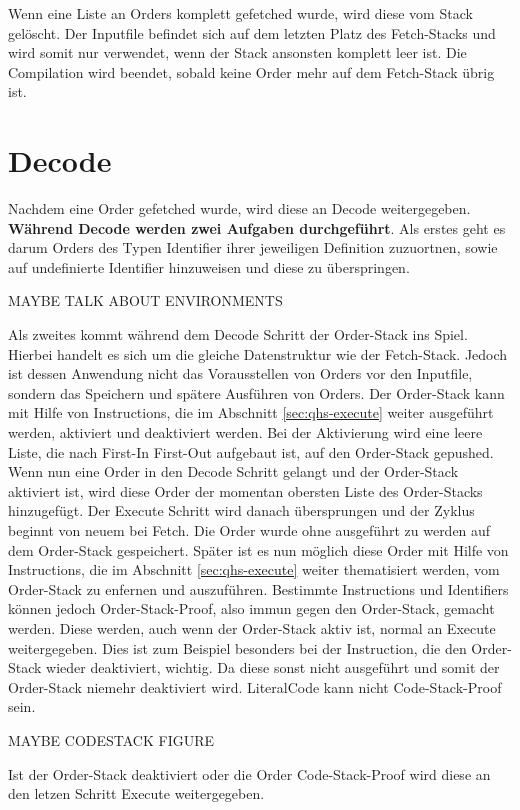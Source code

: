 Wenn eine Liste an Orders komplett gefetched wurde, wird diese vom Stack gelöscht. Der Inputfile befindet sich auf dem letzten Platz des Fetch-Stacks und wird somit nur verwendet, wenn der Stack ansonsten komplett leer ist.
Die Compilation wird beendet, sobald keine Order mehr auf dem Fetch-Stack übrig ist.

\section{Decode} \label{sec:qhs-decode}
Nachdem eine Order gefetched wurde, wird diese an Decode weitergegeben. \textbf{Während Decode werden zwei Aufgaben durchgeführt}.
Als erstes geht es darum Orders des Typen Identifier ihrer jeweiligen Definition zuzuortnen, sowie auf undefinierte Identifier hinzuweisen und diese zu überspringen.

MAYBE TALK ABOUT ENVIRONMENTS

Als zweites kommt während dem Decode Schritt der Order-Stack ins Spiel. Hierbei handelt es sich um die gleiche Datenstruktur wie der Fetch-Stack. Jedoch ist dessen Anwendung nicht das Vorausstellen von Orders vor den Inputfile,
sondern das Speichern und spätere Ausführen von Orders. Der Order-Stack kann mit Hilfe von Instructions, die im Abschnitt \ref{sec:qhs-execute} weiter ausgeführt werden, aktiviert und deaktiviert werden.
Bei der Aktivierung wird eine leere Liste, die nach First-In First-Out aufgebaut ist, auf den Order-Stack gepushed. Wenn nun eine Order in den Decode Schritt gelangt und der Order-Stack aktiviert ist,
wird diese Order der momentan obersten Liste des Order-Stacks hinzugefügt. Der Execute Schritt wird danach übersprungen und der Zyklus beginnt von neuem bei Fetch. Die Order wurde ohne ausgeführt zu werden auf dem Order-Stack gespeichert.
Später ist es nun möglich diese Order mit Hilfe von Instructions, die im Abschnitt \ref{sec:qhs-execute} weiter thematisiert werden, vom Order-Stack zu enfernen und auszuführen.
Bestimmte Instructions und Identifiers können jedoch Order-Stack-Proof, also immun gegen den Order-Stack, gemacht werden. Diese werden, auch wenn der Order-Stack aktiv ist, normal an Execute weitergegeben.
Dies ist zum Beispiel besonders bei der Instruction, die den Order-Stack wieder deaktiviert, wichtig. Da diese sonst nicht ausgeführt und somit der Order-Stack niemehr deaktiviert wird.
LiteralCode kann nicht Code-Stack-Proof sein.

MAYBE CODESTACK FIGURE

Ist der Order-Stack deaktiviert oder die Order Code-Stack-Proof wird diese an den letzen Schritt Execute weitergegeben.

